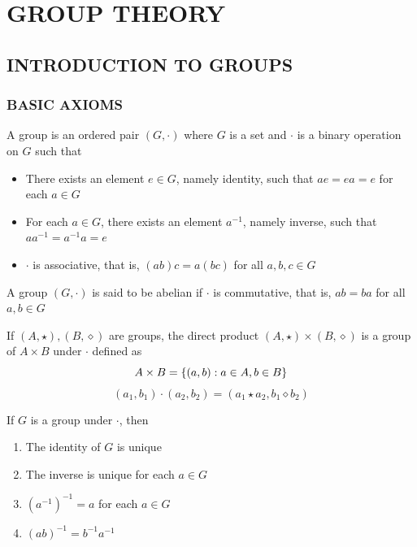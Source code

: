 \chapter{GROUP THEORY}

\section{INTRODUCTION TO GROUPS}

\subsection{BASIC AXIOMS}

\begin{definition}[Group]
	A group is an ordered pair $(G, \cdot)$ where $G$ is a set and $\cdot$ is a binary operation on $G$ such that
	\begin{itemize}
		\item There exists an element $e \in G$, namely identity, such that $ae = ea = e$ for each $a \in G$
		\item For each $a \in G$, there exists an element $a^{-1}$, namely inverse, such that $a a^{-1} = a^{-1} a = e$
		\item $\cdot$ is associative, that is, $(ab)c = a(bc)$ for all $a, b, c \in G$
	\end{itemize}
	A group $(G, \cdot)$ is said to be abelian if $\cdot$ is commutative, that is, $ab = ba$ for all $a, b \in G$
\end{definition}

\begin{definition}
	If $(A, \star), (B, \diamond)$ are groups, the direct product $(A, \star) \times (B, \diamond)$ is a group of $A \times B$ under $\cdot$ defined as
	\[
	A \times B = \{(a, b): a \in A, b \in B\}
	\]
	\[
	(a_1, b_1) \cdot (a_2, b_2) = (a_1 \star a_2, b_1 \diamond b_2)
	\]
\end{definition}

\begin{proposition}
	If $G$ is a group under $\cdot$, then
	\begin{enumerate}
		\item The identity of $G$ is unique
		\item The inverse is unique for each $a \in G$
		\item $(a^{-1})^{-1} = a$ for each $a \in G$
		\item $(ab)^{-1} = b^{-1} a^{-1}$
	\end{enumerate}
\end{proposition}

